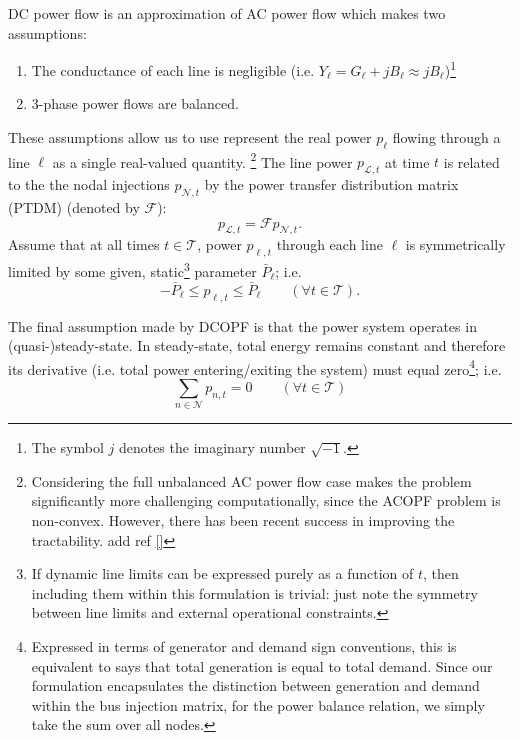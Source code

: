 \documentclass[journal,11pt]{IEEEtran}
\renewcommand{\L}{\mathcal{L}}
\newcommand{\T}{\mathcal{T}}
\newcommand{\N}{\mathcal{N}}
\begin{document}
DC power flow is an approximation of AC power flow which makes two assumptions:
\begin{enumerate}
  \item The conductance of each line is negligible (i.e. $Y_{\ell} = G_\ell + j B_\ell \approx j B_\ell$)\footnote{
    The symbol $j$ denotes the imaginary number $\sqrt{-1}$.
  }
  \item 3-phase power flows are balanced.
\end{enumerate}

These assumptions allow us to use represent the real power $p_{\ell}$ flowing through a line $\ell$ as a single
real-valued quantity.  \footnote{
  Considering the full unbalanced AC power flow case makes the problem significantly more
  challenging computationally, since the ACOPF problem is non-convex. However, there has been recent success in
  improving the tractability. add ref \ref{}
} The line power $p_{\L, t}$ at time $t$ is related to the the nodal injections $p_{\N,t}$ by the power transfer
distribution matrix (PTDM) (denoted by $\mathcal{F}$):
\begin{equation}
  p_{\L, t} = \mathcal{F} p_{\N, t}.
\end{equation}
Assume that at all times $t\in\T$, power $p_{\ell,t}$ through each line $\ell$ is symmetrically limited by some given, 
static\footnote{
  If dynamic line limits can be expressed purely as a function of $t$, then including them within this formulation
  is trivial: just note the symmetry between line limits and external operational constraints.
}
parameter $\bar{P}_\ell$; i.e.
\begin{equation}
  -\bar{P}_\ell \leq p_{\ell,t} \leq \bar{P}_\ell  \qquad (\forall t\in\T).
\end{equation}



The final assumption made by DCOPF is that the power system operates in (quasi-)steady-state. In steady-state,
total energy remains constant and therefore its derivative (i.e. total power entering/exiting the system) must equal zero\footnote{
  Expressed in terms of generator and demand sign conventions, this is equivalent to says that total generation is equal to total demand.
  Since our formulation encapsulates the distinction between generation and demand within the bus injection matrix, for the power balance
  relation, we simply take the sum over all nodes.
}; i.e.
\begin{equation}
  \sum_{n\in\N} p_{n, t} = 0  \qquad (\forall t \in \T)
  \label{eq:nodal-power}
\end{equation}
\end{document}
